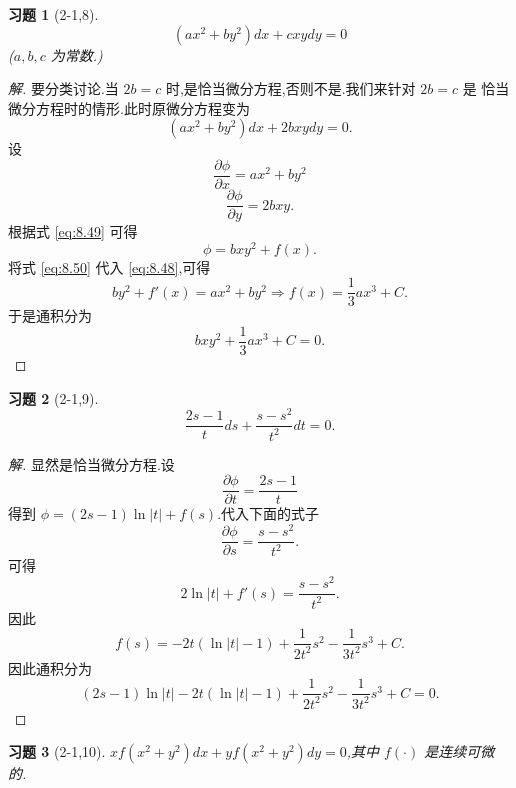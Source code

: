 \documentclass[twoside,11pt]{article}
\newtheorem*{cdtheorem}{习题}
\newenvironment{exercise}
{\begin{mdframed}[backgroundcolor=gray!40,rightline=false,leftline=false,topline=false,bottomline=false]\begin{cdtheorem}}
    {\end{cdtheorem}\end{mdframed}}
\newcommand{\pa}{\partial} \newcommand{\Om}{\Omega}
\begin{document}
\begin{exercise}[2-1,8]
 $$ (ax^2+by^2)dx+cxydy=0 $$($a,b,c$ 为常数.)
\end{exercise}
\begin{proof}[解]
  要分类讨论.当 $2b=c$ 时,是恰当微分方程,否则不是.我们来针对 $2b=c$ 是
  恰当微分方程时的情形.此时原微分方程变为
$$
(ax^2+by^2)dx+2bxydy=0.
$$
  设
  \begin{equation}
    \label{eq:8.48}
    \frac{\pa \phi}{\pa x}=ax^2+by^2
  \end{equation}
  \begin{equation}
    \label{eq:8.49}
    \frac{\pa \phi}{\pa y}=2bxy.
  \end{equation}
根据式 \eqref{eq:8.49} 可得
\begin{equation}
  \label{eq:8.50}
  \phi=bxy^2+f(x).
\end{equation}
将式 \eqref{eq:8.50} 代入 \eqref{eq:8.48},可得
\begin{equation}
  \label{eq:8.51}
  by^2+f'(x)=ax^2+by^2\Rightarrow f(x)=\frac{1}{3}ax^{3}+C.
\end{equation}
于是通积分为
$$
bxy^2+\frac{1}{3}ax^3+C=0.
$$
\end{proof}
\begin{exercise}[2-1,9]
$$
\frac{2s-1}{t}ds+\frac{s-s^2}{t^2}dt=0.
$$
\end{exercise}
\begin{proof}[解]
  显然是恰当微分方程.设
  \begin{equation}
    \label{eq:9.00pm}
    \frac{\pa \phi}{\pa t}=\frac{2s-1}{t}
  \end{equation}
得到 $\phi=(2s-1)\ln |t|+f(s)$.代入下面的式子
  \begin{equation}
    \label{eq:9.01pm}
   \frac{\pa \phi}{\pa s}=\frac{s-s^2}{t^2}. 
  \end{equation}
可得
\begin{equation}
  \label{eq:9.03pm}
  2\ln|t|+f'(s)=\frac{s-s^2}{t^2}.
\end{equation}
因此
$$
f(s)=-2t(\ln|t|-1)+\frac{1}{2t^2}s^2-\frac{1}{3t^2}s^3+C.
$$
因此通积分为
$$
(2s-1)\ln|t|-2t(\ln|t|-1)+\frac{1}{2t^2}s^2-\frac{1}{3t^2}s^3+C=0.
$$
\end{proof}
\begin{exercise}[2-1,10]
$xf(x^2+y^2)dx+yf(x^2+y^2)dy=0$,其中 $f(\cdot)$ 是连续可微的.  
\end{exercise}
\end{document}
